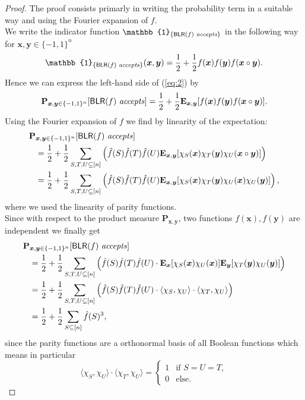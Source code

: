 \documentclass[a4paper]{article}
\newcommand{\prob}{\mathbf{P}}
\newcommand{\expe}{\mathbf{E}}
\newcommand{\nset}{[n]}
\newcommand{\boldx}{\boldsymbol{x}}
\newcommand{\boldy}{\boldsymbol{y}}
\theoremstyle{plain}
\theoremstyle{definition}
\theoremstyle{remark}
\begin{document}
\begin{proof}
  The proof consists primarly in writing the probability term in a
  suitable way and using the Fourier expansion of \(f\). \\
  We write the indicator function \(\mathbb{1}_{\{\textsf{BLR}(f) \text{ \textit{accepts}}\}}\) in the
  following way for \(\boldx,\boldy \in \{-1,1\}^n\)
  \[\mathbb{1}_{\{\textsf{BLR}(f) \text{ \textit{accepts}}\}}(\boldx,\boldy) =
  \frac{1}{2} + \frac{1}{2}f(\boldx)f(\boldy)f(\boldx\circ \boldy).\]
  Hence we can express the left-hand side of (\ref{eq:2}) by
  \[\prob_{\boldx,\boldy \in \{-1,1\}^n}[\textsf{BLR}(f) \text{ \textit{accepts}}] =
  \frac{1}{2} + \frac{1}{2} \expe_{\boldx,\boldy}[f(\boldx) f(\boldy)
  f(\boldx\circ\boldy)].\] 
  Using the Fourier expansion of \(f\) we find by linearity of the expectation: 
  \begin{align}
    \label{eq:3}
    \prob&_{\boldx,\boldy \in \{-1,1\}^n}[\textsf{BLR}(f) \text{ \textit{accepts}}] \notag \\  
    &=  \frac{1}{2} + \frac{1}{2} \sum_{S,T,U \subseteq \nset}\left(\hat{f}(S) \hat{f}(T) \hat{f}(U) \expe_{\boldx,\boldy}[\chi_S(\boldx) \chi_T(\boldy) \chi_U(\boldx\circ \boldy)]\right) \\
    &= \frac{1}{2} + \frac{1}{2} \sum_{S,T,U \subseteq \nset}\left(\hat{f}(S) \hat{f}(T) \hat{f}(U) \expe_{\boldx,\boldy}[\chi_S(\boldx) \chi_T(\boldy) \chi_U(\boldx) \chi_U(\boldy)]\right),  
  \end{align}
  where we used the linearity of parity functions. \\
  Since with respect to the product measure \(\prob_{\boldx,\boldy}\), two functions
  \(f(\boldx),f(\boldy)\) are independent we finally get 
  \begin{align}
    \label{eq:4}
    \prob&_{\boldx,\boldy \in \{-1,1\}^n}[\textsf{BLR}(f) \text{ \textit{accepts}}] \notag \\ 
    &= \frac{1}{2} + \frac{1}{2} \sum_{S,T,U \subseteq \nset}\left(\hat{f}(S) \hat{f}(T) \hat{f}(U) \cdot \expe_{\boldx}[\chi_S(\boldx)\chi_U(\boldx)] \expe_{\boldy}[\chi_T(\boldy)\chi_U(\boldy)]\right) \\
    &= \frac{1}{2} + \frac{1}{2} \sum_{S,T,U \subseteq \nset}\left(\hat{f}(S) \hat{f}(T) \hat{f}(U) \cdot \langle \chi_S, \chi_U \rangle \cdot \langle \chi_T, \chi_U \rangle \right) \\
    &= \frac{1}{2} + \frac{1}{2} \sum_{S \subseteq \nset} \hat{f}(S)^3, 
  \end{align}
  since the parity functions are a orthonormal basis of all Boolean
  functions which means in particular
  \[\langle \chi_S, \chi_U \rangle \cdot \langle \chi_T, \chi_U \rangle = 
  \begin{cases}
    1 & \text{if } S = U = T, \\
    0 & \text{else}.
  \end{cases}
\]
\end{proof}
\end{document}
